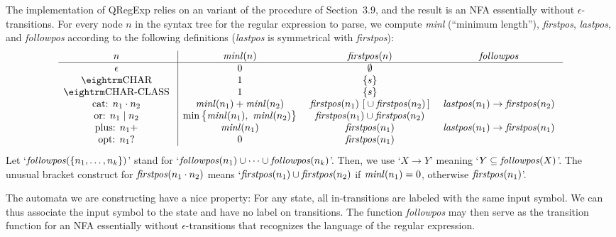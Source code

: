 The implementation of {\sf QRegExp} relies on an variant of the procedure of
Section~3.9, and the result is an NFA essentially without
$\epsilon$-transitions. For every node $n$ in the syntax tree for the regular
expression to parse, we compute {\it minl} (``minimum length''), {\it
firstpos}, {\it lastpos}, and {\it followpos\/} according to the following
definitions ({\it lastpos\/} is symmetrical with {\it firstpos\/}):
  $$\vbox{\halign{\g{#}\vrule && \g{$#$} \cr
    $n$                   & {\it minl}(n)     & {\it firstpos}(n)                 & {\it followpos} \cr
  \noalign{\hrule}
    $\epsilon$            & 0                 & \emptyset \cr
    \tok{char}            & 1                 & \{s\} \cr
    \tok{char-class}      & 1                 & \{s\} \cr
    cat: $n_1 \cdot n_2$  & {\it minl}(n_1) +
                            {\it minl}(n_2)   & {\it firstpos}(n_1)
                                        	\ [{} \cup {\it firstpos}(n_2)\,] & {\it lastpos}(n_1) \rightarrow
                                                                                    {\it firstpos}(n_2) \cr
    or: $n_1 \mid n_2$    & \min\smash{\bigl\{}{\it minl}(n_1),
                            \ {\it minl}(n_2)\smash{\bigr\}}
                                              & {\it firstpos}(n_1) \cup
                                        	{\it firstpos}(n_2) \cr
    plus: $n_1+$          & {\it minl}(n_1)   & {\it firstpos}(n_1)               & {\it lastpos}(n_1) \rightarrow
                                                                                    {\it firstpos}(n_1) \cr
    opt: $n_1?$           & 0                 & {\it firstpos}(n_1) \cr
  }}$$
Let `${\it followpos}(\{n_1, \ldots, n_k\})$' stand for `${\it followpos}(n_1)
\cup \cdots \cup {\it followpos}(n_k)$'. Then, we use `$X \rightarrow Y$'
meaning `$Y \subseteq {\it followpos}(X)$'. The unusual bracket construct for
${\it firstpos}(n_1 \cdot n_2)$ means `${\it firstpos}(n_1) \cup {\it
firstpos}(n_2)$ if ${\it minl}(n_1) = 0$, otherwise ${\it firstpos}(n_1)$'.

The automata we are constructing have a nice property: For any state, all
in-transitions are labeled with the same input symbol. We can thus associate
the input symbol to the state and have no label on transitions. The function
{\it followpos\/} may then serve as the transition function for an NFA
essentially without $\epsilon$-transitions that recognizes the language of the
regular expression.

